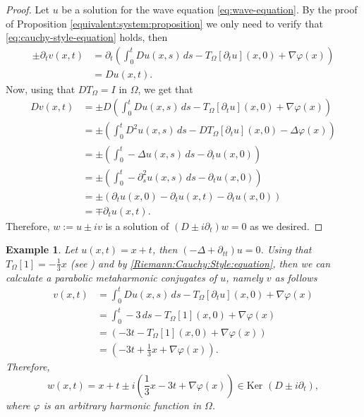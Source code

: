 \documentclass[12pt]{article}
\newtheorem{example}[theorem]{Example}
\let\phi\varphi
\begin{document}
\begin{proof}
    Let $u$ be a solution for the wave equation \eqref{eq:wave-equation}. By the proof of Proposition \ref{equivalent:system:proposition} we only need to verify that \eqref{eq:cauchy-style-equation} holds, then
    \begin{align*}
        \pm\partial_tv(x,t)&=\partial_t\left(\int_0^tDu(x,s)\, ds-T_\Omega[\partial_t u](x,0)+\nabla\phi(x)\right)\\
        &= Du(x,t).
    \end{align*}
    Now, using that $DT_{\Omega}=I$ in $\Omega$, we get that
    \begin{align*}
        Dv(x,t)&=\pm D\left(\int_0^tDu(x,s)\, ds-T_\Omega[\partial_tu](x,0)+\nabla\phi(x)\right)\\
        &=\pm \left(\int_0^tD^2 u(x,s)\, ds-DT_\Omega[\partial_tu](x,0)-\Delta \phi(x)\right)\\
        &=\pm \left(\int_0^t-\Delta u(x,s)\,ds-\partial_tu(x,0)\right)\\
        &=\pm \left(\int_0^t-\partial_s^2u(x,s)\,ds-\partial_tu(x,0)\right)\\
        &=\pm(\partial_tu(x,0)-\partial_tu(x,t)-\partial_tu(x,0))\\
        &=\mp\partial_tu(x,t).
    \end{align*}
    Therefore, $w:=u\pm iv$ is a solution of $(D\pm i\partial_t)w=0$ as we desired.
\end{proof}

\begin{example}
    Let $u(x,t)=x+t$, then $(-\Delta+\partial_{tt})u=0$.
    Using that $T_{\Omega}[1]=-\frac{1}{3}x$ (see \cite[Appendix]{gurlebeck1997quaternionic}) and by \eqref{Riemann:Cauchy:Style:equation}, then we can calculate a parabolic metaharmonic conjugates of $u$, namely $v$ as follows
    \begin{align*}
        v(x,t)&= \int_0^t Du(x,s)\, ds-T_\Omega[\partial_t u](x,0)+\nabla \phi(x)\\
        &=\int_0^t -3\,ds-T_\Omega[1](x,0)+\nabla \varphi(x)\\
        &= \left(-3t-T_\Omega[1](x,0)+\nabla \varphi(x)\right)\\
        &= \left(-3t+\frac{1}{3}x+\nabla \varphi(x)\right).
    \end{align*}
    Therefore,
    \[ w(x,t)=x+t\pm i\left(\frac{1}{3}x-3t+\nabla \varphi(x)\right)\in \text{Ker }(D\pm i\partial_t),\]
where $\varphi$ is an arbitrary harmonic function in $\Omega$.
\end{example}
\end{document}
